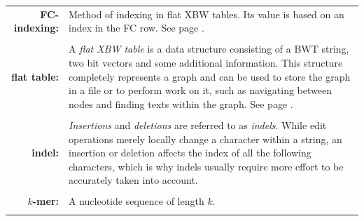 \documentclass[a4paper,12pt,twoside,BCOR=10mm]{scrbook}
\begin{document}
\begin{tabular}{r p{12cm}}
\textbf{FC-indexing:} & Method of indexing in flat XBW tables.
Its value is based on an index in the FC row.
See page \pageref{def:fc_indexing}.
\\ \\

\textbf{flat table:} & A \textit{flat XBW table} is a data structure consisting of a BWT string,
two bit vectors and some additional information. This structure completely represents a graph
and can be used to store the graph in a file or to perform work on it, such as navigating between
nodes and finding texts within the graph.
See page \pageref{def:flat_table}.
\\ \\

\textbf{indel:} &
\textit{Insertions} and \textit{deletions} are referred to as \textit{indels}. While
edit operations merely locally change a character within a string, an insertion or
deletion affects the index of all the following characters, which is why indels
usually require more effort to be accurately taken into account.
\\ \\

$k$\textbf{-mer:} &
A nucleotide sequence of length $ k $.
\\ \\

\end{tabular}
\end{document}

